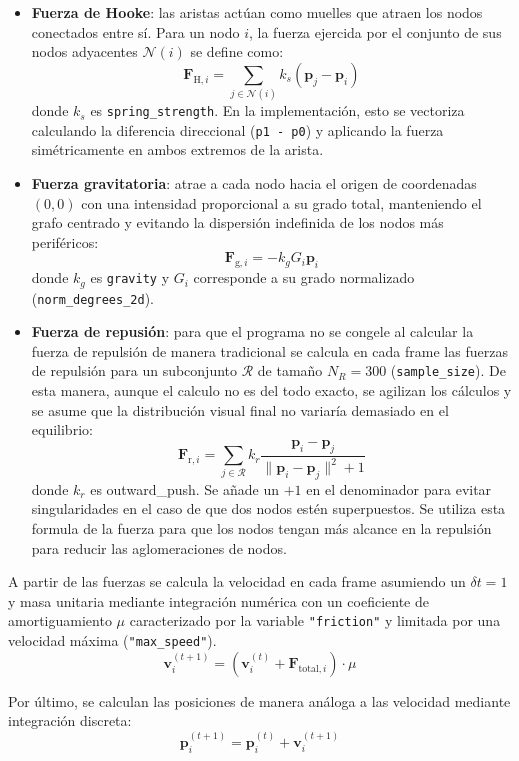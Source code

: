 \documentclass[12pt,a4paper]{report}
\begin{document}
\begin{itemize}
	\item \textbf{Fuerza de Hooke}: las aristas actúan como muelles que atraen los nodos conectados entre sí. Para un nodo $i$, la fuerza ejercida por el conjunto de sus nodos adyacentes $\mathcal{N}(i)$ se define como:
	$$\mathbf{F}_{\text{H}, i} = \sum_{j \in \mathcal{N}(i)} k_s (\mathbf{p}_j - \mathbf{p}_i)$$
	donde $k_s$ es \texttt{spring\_strength}. En la implementación, esto se vectoriza calculando la diferencia direccional (\texttt{p1 - p0}) y aplicando la fuerza simétricamente en ambos extremos de la arista.
	
	\item \textbf{Fuerza gravitatoria}: atrae a cada nodo hacia el origen de coordenadas $(0,0)$ con una intensidad proporcional a su grado total, manteniendo el grafo centrado y evitando la dispersión indefinida de los nodos más periféricos:
	$$\mathbf{F}_{\text{g}, i} = - k_g G_i \mathbf{p}_i$$
	donde $k_g$ es \texttt{gravity} y $G_i$ corresponde a su grado normalizado (\texttt{norm\_degrees\_2d}).
	
	\item \textbf{Fuerza de repusión}: para que el programa no se congele al calcular la fuerza de repulsión de manera tradicional se calcula en cada frame las fuerzas de repulsión para un subconjunto $\mathcal{R}$ de tamaño $N_R = 300$ (\texttt{sample\_size}). De esta manera, aunque el calculo no es del todo exacto, se agilizan los cálculos y se asume que la distribución visual final no variaría demasiado en el equilibrio:
	$$\mathbf{F}_{\text{r}, i} = \sum_{j \in \mathcal{R}} k_r \frac{\mathbf{p}_i - \mathbf{p}_j}{\|\mathbf{p}_i - \mathbf{p}_j\|^2 + 1}$$
	donde $k_r$ es outward\_push. Se añade un \(+1\) en el denominador para evitar singularidades en el caso de que dos nodos estén superpuestos. Se utiliza esta formula de la fuerza para que los nodos tengan más alcance en la repulsión para reducir las aglomeraciones de nodos.
\end{itemize}

A partir de las fuerzas se calcula la velocidad en cada frame asumiendo un $\delta t =1$ y masa unitaria mediante integración numérica con un coeficiente de amortiguamiento $\mu$ caracterizado por la variable \texttt{"friction"} y limitada por una velocidad máxima (\texttt{"max\_speed"}).
$$\mathbf{v}_i^{(t+1)} = \left(\mathbf{v}_i^{(t)} + \mathbf{F}_{\text{total}, i}\right) \cdot \mu$$

Por último, se calculan las posiciones de manera análoga a las velocidad mediante integración discreta:
$$\mathbf{p}_i^{(t+1)} = \mathbf{p}_i^{(t)} + \mathbf{v}_i^{(t+1)}$$
\end{document}
